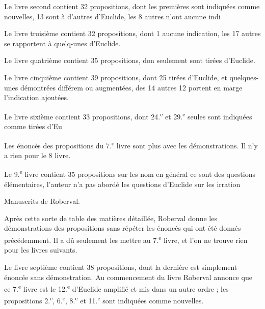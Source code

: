\documentclass[11pt,a4paper]{article}
\begin{document}
Le livre second contient 32 propositions, dont les \ill{} premières sont indiquées comme nouvelles, 13 sont \ill{} à d'autres d'Euclide, les 8 autres n'ont aucune indi

Le livre troisième contient 32 propositions, dont 1\ill{} aucune indication, les 17 autres se rapportent à quelq-unes d'Euclide.

Le livre quatrième contient 35 propositions, don \ill{} seulement sont tirées d'Euclide.

Le livre cinquième contient 39 propositions, dont 25 tirées d'Euclide, et quelques-unes démontrées différem ou augmentées, des 14 autres 12 portent en marge l'indication ajoutées.

Le livre sixième contient 33 propositions, dont \ill{} 24.\textsuperscript{e} et 29.\textsuperscript{e} seules sont indiquées comme tirées d'Eu

Les énoncés des propositions du 7.\textsuperscript{e} livre sont plus\ill{} avec les démonstrations. Il n'y a rien pour le 8 livre.

Le 9.\textsuperscript{e} livre contient 35 propositions sur les nom en général ce sont des questions élémentaires, l'auteur n'a pas abordé les questions d'Euclide sur les irration\ill{}

Manuscrits de Roberval.

Après cette sorte de table des matières détaillée, Roberval donne les démonstrations des propositions sans répéter les énoncés qui ont été donnés précédemment. Il a dû seulement les mettre au 7.\textsuperscript{e} livre, et l'on ne trouve rien pour les livres suivants.

Le livre septième contient 38 propositions, dont la dernière est simplement énoncée sans démonstration. Au commencement du livre Roberval annonce que ce 7.\textsuperscript{e} livre est le 12.\textsuperscript{e} d'Euclide amplifié et mis dans un autre ordre ; les propositions 2.\textsuperscript{e}, 6.\textsuperscript{e}, 8.\textsuperscript{e} et 11.\textsuperscript{e} sont indiquées comme nouvelles.
\end{document}
